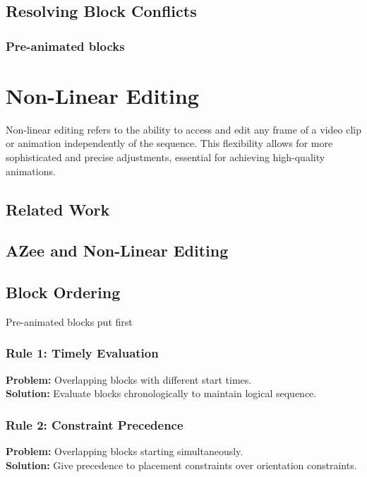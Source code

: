 \documentclass[../../main.tex]{subfiles}
\begin{document}
\subsection{Resolving Block Conflicts}


\subsubsection{Pre-animated blocks}

\section{Non-Linear Editing}

Non-linear editing refers to the ability to access and edit any frame of a video clip or animation independently of the sequence. This flexibility allows for more sophisticated and precise adjustments, essential for achieving high-quality animations.

\subsection{Related Work}

\subsection{AZee and Non-Linear Editing}

\subsection{Block Ordering}

Pre-animated blocks put first

\subsubsection{Rule 1: Timely Evaluation}
\textbf{Problem:} Overlapping blocks with different start times.\\
\textbf{Solution:} Evaluate blocks chronologically to maintain logical sequence.

\subsubsection{Rule 2: Constraint Precedence}
\textbf{Problem:} Overlapping blocks starting simultaneously.\\
\textbf{Solution:} Give precedence to placement constraints over orientation constraints.
\end{document}
